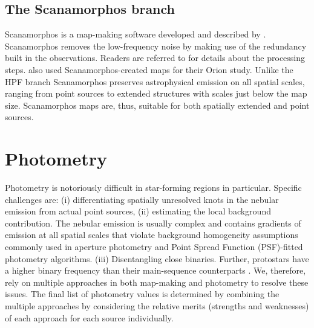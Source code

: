 \documentclass[manuscript]{aastex61}
\begin{document}
\subsection{The Scanamorphos branch}
\par
Scanamorphos is a map-making software developed and described by \cite{scanamorphos}.  Scanamorphos removes the low-frequency noise by making use of the redundancy built in the observations.  Readers are referred to \cite{scanamorphos} for details about the processing steps.   \citet{pbrpaper} also used Scanamorphos-created maps for their Orion study.  Unlike the HPF branch Scanamorphos preserves astrophysical emission on all spatial scales, ranging from point sources to extended structures with scales just below the map size.   Scanamorphos maps are, thus, suitable for both spatially extended and point sources.

\section{Photometry}
\label{sec:phot}
\par
Photometry is notoriously difficult in star-forming regions in particular.  Specific challenges are: (i) differentiating spatially unresolved knots in the nebular emission from actual point sources, (ii) estimating the local background contribution.  The nebular emission is usually complex and contains gradients of emission at all spatial scales that violate background homogeneity assumptions commonly used in aperture photometry and Point Spread Function (PSF)-fitted photometry algorithms.  (iii) Disentangling close binaries.  Further, protostars have a higher binary frequency than their main-sequence counterparts \citep{binaries}.  We, therefore, rely on multiple approaches in both map-making and photometry to resolve these issues.  The final list of photometry values is determined by combining the multiple approaches by considering the relative merits (strengths and weaknesses) of each approach for each source individually.
\end{document}
